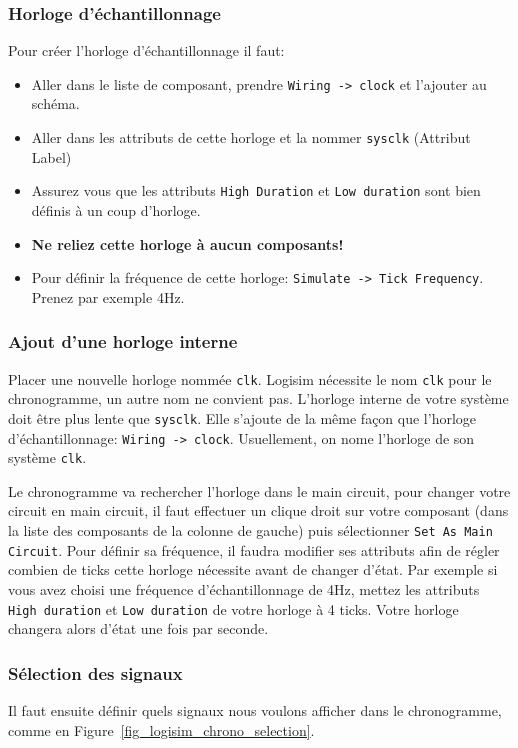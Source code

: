 \documentclass[nosolution]{exercice}
\begin{document}
\subsubsection{Horloge d'échantillonnage}
Pour créer l'horloge d'échantillonnage il faut:
\begin{itemize}
\item Aller dans le liste de composant, prendre \texttt{Wiring -> clock} et l'ajouter au schéma.
\item Aller dans les attributs de cette horloge et la nommer \texttt{sysclk} (Attribut Label)
\item Assurez vous que les attributs \texttt{High Duration} et \texttt{Low duration} sont bien définis à un coup
d'horloge.
\item \textbf{Ne reliez cette horloge à aucun composants!}
\item Pour définir la fréquence de cette horloge: \texttt{Simulate -> Tick Frequency}. Prenez par exemple 4Hz.
\end{itemize}

\subsubsection{Ajout d'une horloge interne}
Placer une nouvelle horloge nommée \texttt{clk}. Logisim nécessite le nom \texttt{clk} pour le chronogramme, un autre nom ne convient pas.
L'horloge interne de votre système doit être plus lente que \texttt{sysclk}. Elle s'ajoute de la même façon que l'horloge
d'échantillonnage: \texttt{Wiring -> clock}.
Usuellement, on nome l'horloge de son système \texttt{clk}.

Le chronogramme va rechercher l'horloge dans le main circuit, pour changer votre circuit en main circuit,
il faut effectuer un clique droit sur votre composant (dans la liste des composants de la colonne de gauche) puis
sélectionner \texttt{Set As Main Circuit}.
Pour définir sa fréquence, il faudra modifier ses attributs afin de régler combien de ticks cette horloge nécessite
avant de changer d'état.  Par exemple si vous avez choisi une fréquence d'échantillonnage de 4Hz, mettez les attributs
\texttt{High duration} et \texttt{Low duration} de votre horloge à 4 ticks. Votre horloge changera alors d'état une fois
par seconde.

\subsubsection{Sélection des signaux}
Il faut ensuite définir quels signaux nous voulons afficher dans le chronogramme, comme en
Figure~\ref{fig_logisim_chrono_selection}.
\end{document}

